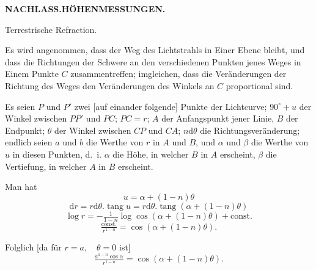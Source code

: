 \par\clearpage
\noindent\null\hfill{\small\textbf{NACHLASS.\quad HÖHENMESSUNGEN.}}\hfill{}\par
\vspace*{2.4cm}
\begin{center}{\Large\textbf{}}\par\vspace{1.3cm}
Terrestrische Refraction.\par\medskip
[1.]
\end{center}
\par\noindent\hspace*{\parindent}Es wird angenommen, dass der Weg des Lichtstrahls in Einer Ebene
bleibt, und dass die Richtungen der Schwere an den verschiedenen Punkten
jenes Weges in Einem Punkte \(C\) zusammentreffen; imgleichen, dass die Veränderungen der Richtung des Weges den Veränderungen des Winkels an \(C\)
proportional sind.
\par\noindent\hspace*{\parindent}Es seien \(P\) und \(P'\) zwei [auf einander folgende] Punkte der Lichtcurve;
\(90^\circ+u\) der Winkel zwischen \(PP'\) und \(PC\); \(PC=r\); \(A\) der Anfangspunkt
jener Linie, \(B\) der Endpunkt; \(\theta\) der Winkel zwischen \(CP\) und \(CA\); \(n\mathrm{d}\theta\) die
Richtungsveränderung; endlich seien \(a\) und \(b\) die Werthe von \(r\) in \(A\) und \(B\),
und \(\alpha\) und \(\beta\) die Werthe von \(u\) in diesen Punkten, d.~i. \(\alpha\) die Höhe, in welcher
\(B\) in \(A\) erscheint, \(\beta\) die Vertiefung, in welcher \(A\) in \(B\) erscheint.
\par\noindent\hspace*{\parindent}Man hat
\[u=\alpha+(1-n)\theta\]
\[\mathrm{d}r=r\mathrm{d}\theta.\operatorname{tang}u=r\mathrm{d}\theta.\operatorname{tang}(\alpha+(1-n)\theta)\]
\noindent [oder]
\[\log r=-\tfrac{1}{1-n}\log\cos(\alpha+(1-n)\theta)+\mathrm{const.}\]
\[\tfrac{\mathrm{const.}}{r^{1-n}}=\cos(\alpha+(1-n)\theta).\]
\par\noindent\hspace*{\parindent}Folglich [da für \(r=a,\quad\theta=0\) ist]
\[\tfrac{a^{1-n}\cos\alpha}{r^{1-n}}=\cos(\alpha+(1-n)\theta).\]

